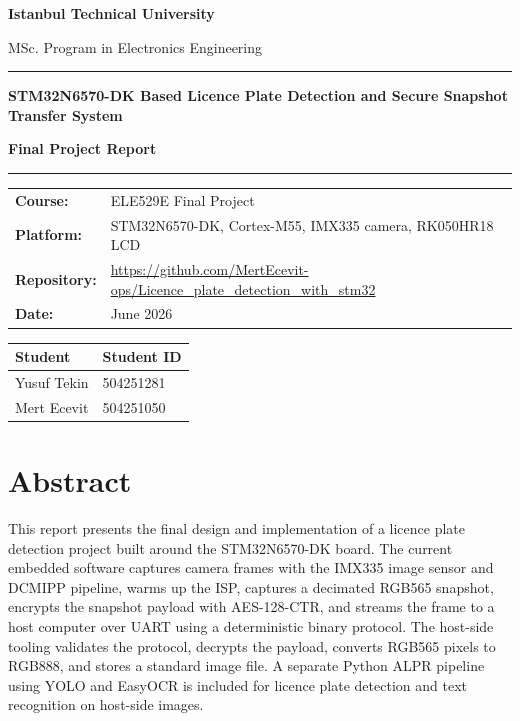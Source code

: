 \documentclass[11pt,a4paper]{article}
\newcommand{\projecttitle}{STM32N6570-DK Based Licence Plate Detection and Secure Snapshot Transfer System}
\newcommand{\coursename}{ELE529E Final Project}
\begin{document}
\begin{titlepage}
  \centering
  \vspace*{1.0cm}
  {\Large\bfseries Istanbul Technical University\par}
  \vspace{0.25cm}
  {\large MSc. Program in Electronics Engineering\par}
  \vspace{1.6cm}
  {\color{ituBlue}\rule{\textwidth}{1.2pt}\par}
  \vspace{0.55cm}
  {\LARGE\bfseries \projecttitle\par}
  \vspace{0.35cm}
  {\Large\bfseries Final Project Report\par}
  \vspace{0.55cm}
  {\color{ituBlue}\rule{\textwidth}{1.2pt}\par}
  \vspace{1.2cm}
  \begin{tabularx}{\textwidth}{>{\raggedleft\arraybackslash}p{3.2cm}>{\raggedright\arraybackslash}X}
    \textbf{Course:} & \coursename \\
    \textbf{Platform:} & STM32N6570-DK, Cortex-M55, IMX335 camera, RK050HR18 LCD \\
    \textbf{Repository:} & \url{https://github.com/MertEcevit-ops/Licence_plate_detection_with_stm32} \\
    \textbf{Date:} & June 2026
  \end{tabularx}
  \vfill
  \begin{tabular}{ll}
    \toprule
    \textbf{Student} & \textbf{Student ID} \\
    \midrule
    Yusuf Tekin & 504251281 \\
    Mert Ecevit & 504251050 \\
    \bottomrule
  \end{tabular}
  \vspace*{1.0cm}
\end{titlepage}

\tableofcontents
\newpage
{}

\section{Abstract}
This report presents the final design and implementation of a licence plate
detection project built around the STM32N6570-DK board. The current embedded
software captures camera frames with the IMX335 image sensor and DCMIPP
pipeline, warms up the ISP, captures a decimated RGB565 snapshot, encrypts the
snapshot payload with AES-128-CTR, and streams the frame to a host computer over
UART using a deterministic binary protocol. The host-side tooling validates the
protocol, decrypts the payload, converts RGB565 pixels to RGB888, and stores a
standard image file. A separate Python ALPR pipeline using YOLO and EasyOCR is
included for licence plate detection and text recognition on host-side images.
\end{document}
